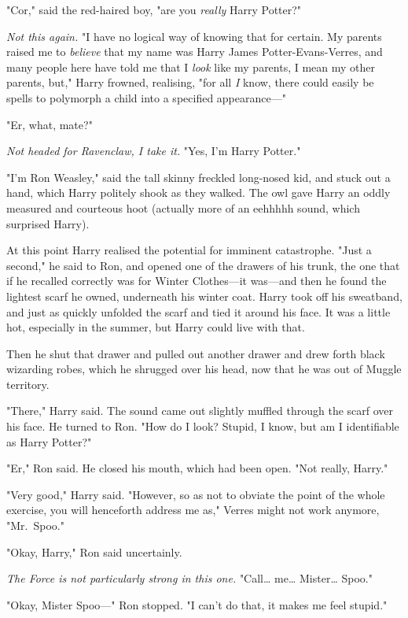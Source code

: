 "Cor," said the red-haired boy, "are you \emph{really} Harry Potter?"

\emph{Not this again.} "I have no logical way of knowing that for certain. My 
parents raised me to \emph{believe} that my name was Harry James 
Potter-Evans-Verres, and many people here have told me that I \emph{look} like 
my parents, I mean my other parents, but," Harry frowned, realising, "for all 
\emph{I} know, there could easily be spells to polymorph a child into a 
specified appearance---"

"Er, what, mate?"

\emph{Not headed for Ravenclaw, I take it.} "Yes, I'm Harry Potter."

"I'm Ron Weasley," said the tall skinny freckled long-nosed kid, and stuck out 
a hand, which Harry politely shook as they walked. The owl gave Harry an oddly 
measured and courteous hoot (actually more of an eehhhhh sound, which surprised 
Harry).

At this point Harry realised the potential for imminent catastrophe. "Just a 
second," he said to Ron, and opened one of the drawers of his trunk, the one 
that if he recalled correctly was for Winter Clothes---it was---and then he 
found the lightest scarf he owned, underneath his winter coat. Harry took off 
his sweatband, and just as quickly unfolded the scarf and tied it around his 
face. It was a little hot, especially in the summer, but Harry could live with 
that.

Then he shut that drawer and pulled out another drawer and drew forth black 
wizarding robes, which he shrugged over his head, now that he was out of Muggle 
territory.

"There," Harry said. The sound came out slightly muffled through the scarf over 
his face. He turned to Ron. "How do I look? Stupid, I know, but am I 
identifiable as Harry Potter?"

"Er," Ron said. He closed his mouth, which had been open. "Not really, Harry."

"Very good," Harry said. "However, so as not to obviate the point of the whole 
exercise, you will henceforth address me as," Verres might not work anymore, 
"Mr.~Spoo."

"Okay, Harry," Ron said uncertainly.

\emph{The Force is not particularly strong in this one.} "Call{\ldots} 
me{\ldots} Mister{\ldots} Spoo."

"Okay, Mister Spoo---" Ron stopped. "I can't do that, it makes me feel stupid."

